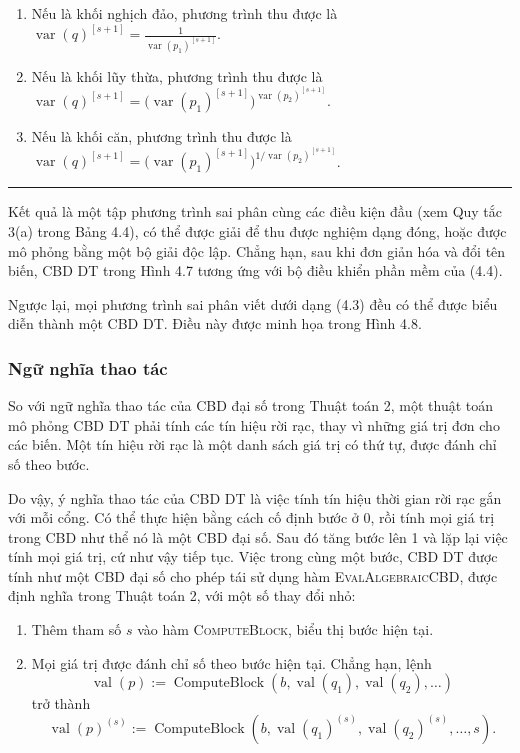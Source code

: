 \begin{table}[htbp]
\begin{minipage}{\linewidth}
\begin{enumerate}
\begin{enumerate}
\item Nếu là khối nghịch đảo, phương trình thu được là $\operatorname{var}(q)^{[s+1]}=\frac{1}{\operatorname{var}(p_1)^{[s+1]}}$.
\item Nếu là khối lũy thừa, phương trình thu được là $\operatorname{var}(q)^{[s+1]}=\bigl(\operatorname{var}(p_1)^{[s+1]}\bigr)^{\operatorname{var}(p_2)^{[s+1]}}$.
\item Nếu là khối căn, phương trình thu được là $\operatorname{var}(q)^{[s+1]}=\bigl(\operatorname{var}(p_1)^{[s+1]}\bigr)^{1/\operatorname{var}(p_2)^{[s+1]}}$.
\end{enumerate}
\end{enumerate}\medskip\hrule\end{minipage}
\end{table}

Kết quả là một tập phương trình sai phân cùng các điều kiện đầu (xem Quy tắc 3(a) trong Bảng 4.4), có thể được giải để thu được nghiệm dạng đóng, hoặc được mô phỏng bằng một bộ giải độc lập. Chẳng hạn, sau khi đơn giản hóa và đổi tên biến, CBD DT trong Hình 4.7 tương ứng với bộ điều khiển phần mềm của (4.4).

Ngược lại, mọi phương trình sai phân viết dưới dạng (4.3) đều có thể được biểu diễn thành một CBD DT. Điều này được minh họa trong Hình 4.8.
\subsubsection{Ngữ nghĩa thao tác}
So với ngữ nghĩa thao tác của CBD đại số trong Thuật toán 2, một thuật toán mô phỏng CBD DT phải tính các tín hiệu rời rạc, thay vì những giá trị đơn cho các biến. Một tín hiệu rời rạc là một danh sách giá trị có thứ tự, được đánh chỉ số theo bước.

Do vậy, ý nghĩa thao tác của CBD DT là việc tính tín hiệu thời gian rời rạc gắn với mỗi cổng. Có thể thực hiện bằng cách cố định bước ở 0, rồi tính mọi giá trị trong CBD như thể nó là một CBD đại số. Sau đó tăng bước lên 1 và lặp lại việc tính mọi giá trị, cứ như vậy tiếp tục. Việc trong cùng một bước, CBD DT được tính như một CBD đại số cho phép tái sử dụng hàm \textsc{EvalAlgebraicCBD}, được định nghĩa trong Thuật toán 2, với một số thay đổi nhỏ:
\begin{enumerate}
\item Thêm tham số $s$ vào hàm \textsc{ComputeBlock}, biểu thị bước hiện tại.
\item Mọi giá trị được đánh chỉ số theo bước hiện tại. Chẳng hạn, lệnh
\[\operatorname{val}(p):=\operatorname{ComputeBlock}(b,\operatorname{val}(q_1),\operatorname{val}(q_2),\ldots)\]
trở thành
\[\operatorname{val}(p)^{(s)}:=\operatorname{ComputeBlock}(b,\operatorname{val}(q_1)^{(s)},\operatorname{val}(q_2)^{(s)},\ldots,s).\]
\end{enumerate}

